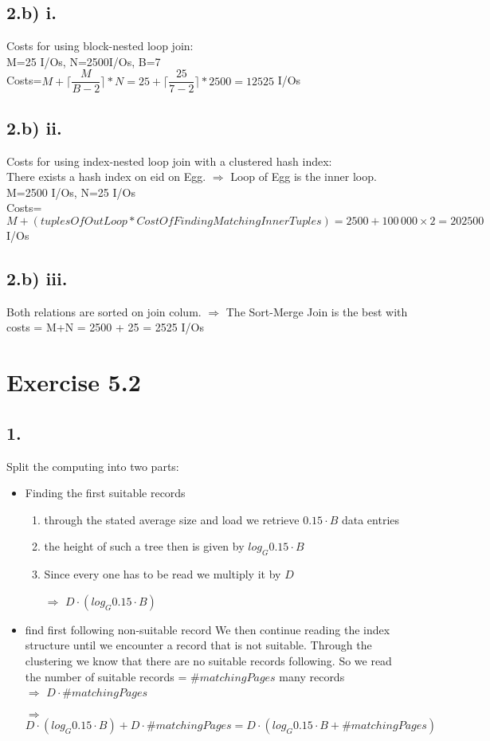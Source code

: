 \documentclass[12pt]{article}
\begin{document}
	\subsection*{2.b) i.}
	Costs for using block-nested loop join:\\
	M=25 I/Os, N=2500I/Os, B=7\\
	Costs=$M+\lceil \dfrac{M}{B-2} \rceil\ast N = 25+\lceil \dfrac{25}{7-2}\rceil \ast 2500=12525$ I/Os \\
	\subsection*{2.b) ii.}
	Costs for using index-nested loop join with a clustered hash index:\\
	There exists a hash index on eid on Egg. $\Rightarrow$ Loop of Egg is the inner loop.\\
	M=2500 I/Os, N=25 I/Os\\
	Costs=$M+(tuplesOfOutLoop\ast CostOfFindingMatchingInnerTuples)=2500+100\,000\times 2=202500$ I/Os
	\subsection*{2.b) iii.}
	Both relations are sorted on join colum. $\Rightarrow$ The Sort-Merge Join is the best with\\
	costs = M+N = 2500 + 25 = 2525 I/Os
	\section*{Exercise 5.2}
	\subsection*{1.}
		Split the computing into two parts:
		\begin{itemize}
			\item Finding the first suitable records\\
				\begin{enumerate}
					\item through the stated average size and load we retrieve $0.15\cdot B$ data entries
					\item the height of such a tree then is given by $log_G 0.15\cdot B$
					\item Since every one has to be read we multiply it by $D$
					\item[$\Rightarrow$] $D\cdot(log_G 0.15\cdot B)$
				\end{enumerate}				
			\item find first following non-suitable record 
				We then continue reading the index structure until we encounter a record that is not suitable. Through the clustering we know that there are no suitable records following. So we read the number of suitable records = $\# matchingPages$ many records\\
				$\Rightarrow$ $D\cdot \# matchingPages$
			\item[$\Rightarrow$] $D\cdot(log_G 0.15\cdot B) + D\cdot \# matchingPages = D\cdot(log_G 0.15\cdot B + \# matchingPages)$
		\end{itemize}
\end{document}

